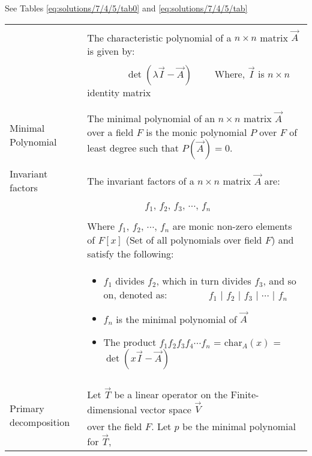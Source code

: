 See Tables \ref{eq:solutions/7/4/5/tab0}
and \ref{eq:solutions/7/4/5/tab}

\onecolumn
\begin{longtable}{|p{4.5cm}|p{13.5cm}|}
	\hline
	    &\\
		\endhead
		&\\
		\hline
		\endfoot
	\multirow{3}{*}{Characteristic Polynomial} 
	& The characteristic polynomial of a $n \times n$ matrix $\vec{A}$ is given by:\\
	&\\
	& $\qquad\qquad\boxed{\det(\lambda\vec{ I}-\vec{A})} \qquad$ Where, $\vec{I}$ is $n\times n$ identity matrix  \\
	&\\
	\hline
	\multirow{3}{*}{Minimal Polynomial} 
	& \\
	& The minimal polynomial of an $n \times n$ matrix $\vec{A}$ over a field $F$ is the monic polynomial $P$ over $F$ of least degree such that $P(\vec{A}) = 0$.\\
	&\\
	\hline
	\multirow{3}{*}{Invariant factors} & \\
	& The invariant factors of a $n\times n$ matrix $\vec{A}$ are: \\
    & \\
    &$\qquad\qquad\qquad f_1$, $f_2$, $f_3$, $\cdots$, $f_n$\\
    &\\
    &Where $f_1$, $f_2$, $\cdots$, $f_n$ are monic non-zero elements of $F[x]$ (Set of all polynomials over field $F$) and satisfy the following:\\
    &\begin{itemize}
        \item $f_1$ divides $f_2$, which in turn divides $f_3$, and so on, denoted as: \newline
        $\qquad \qquad f_1$ $|$ $f_2$ $|$ $f_3$ $|$ $\cdots$ $|$ $f_n$
        \item $f_n$ is the minimal polynomial of $\vec{A}$
        \item The product $f_1f_2f_3f_4\cdots f_n$ = char$_A(x)$ =$\det(x\vec{I}-\vec{A})$
    \end{itemize}\\
    \hline
    \multirow{3}{*}{\hypertarget{pdt}{Primary decomposition}} & \\
	& Let $\vec{T}$ be a linear operator on the Finite-dimensional vector space $\vec{V}$ \\ theorem
    & over the field $F$. Let $p$ be the minimal polynomial for $\vec{T}$,  \\

\end{longtable}
